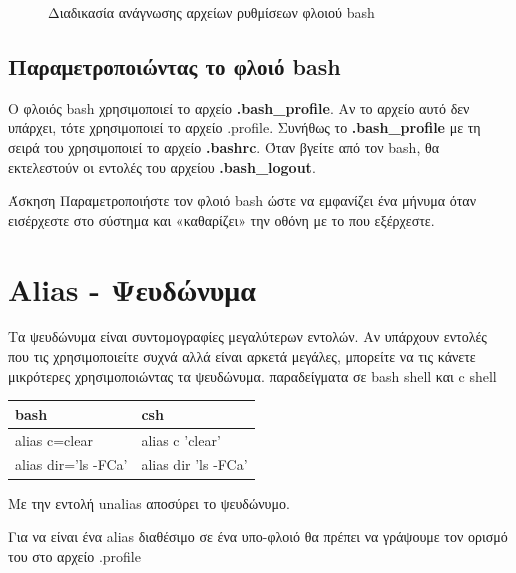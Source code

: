 \begin{figure}[ht]
	\centering
	\caption{Διαδικασία ανάγνωσης αρχείων ρυθμίσεων φλοιού bash}
	\label{fig:startup_scripts}
\end{figure} 

\subsection{Παραμετροποιώντας το φλοιό bash}

Ο φλοιός bash χρησιμοποιεί το αρχείο \textbf{.bash\_profile}. Αν το αρχείο αυτό δεν υπάρχει, τότε χρησιμοποιεί το αρχείο .profile. Συνήθως
το \textbf{.bash\_profile} με τη σειρά του χρησιμοποιεί το αρχείο \textbf{.bashrc}. Όταν βγείτε από τον bash, θα εκτελεστούν οι εντολές του
αρχείου \textbf{.bash\_logout}.


\begin{exercisebox}{  Άσκηση}
 Παραμετροποιήστε τον φλοιό bash ώστε να εμφανίζει ένα μήνυμα όταν εισέρχεστε στο σύστημα και «καθαρίζει» την οθόνη με το που  εξέρχεστε.
\end{exercisebox}

\section*{Alias - Ψευδώνυμα}

Τα ψευδώνυμα είναι συντομογραφίες μεγαλύτερων εντολών. Αν υπάρχουν εντολές που τις χρησιμοποιείτε συχνά αλλά είναι αρκετά μεγάλες, μπορείτε
να τις κάνετε μικρότερες
χρησιμοποιώντας τα ψευδώνυμα.
παραδείγματα σε bash shell και c shell

\begin{center}
	\begin{tabular}{ l | l }
		bash			&	csh \\
		\hline
		alias c=clear		&	alias c 'clear' \\
		alias dir='ls -FCa'	&	alias dir 'ls -FCa' \\
	\end{tabular} 
\end{center}

Mε την εντολή unalias αποσύρει το ψευδώνυμο.

Για να είναι ένα alias διαθέσιμο σε ένα υπο-φλοιό θα πρέπει να γράψουμε τον ορισμό του στο αρχείο .profile

